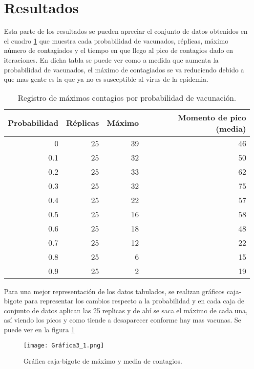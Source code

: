 \documentclass[a4paper, 11pt]{article}
\begin{document}
\section{Resultados}
Esta parte de los resultados se pueden apreciar el conjunto de datos obtenidos en el cuadro \ref{tab1} que muestra cada probabilidad de vacunados, réplicas, máximo número de contagiados y el tiempo en que llego al pico de contagios dado en iteraciones. En dicha tabla se puede ver como a medida que aumenta la probabilidad de vacunados, el máximo de contagiados se va reduciendo debido a que mas gente es la que ya no es susceptible al virus de la epidemia.
    \begin{table}[H]
        \caption{Registro de máximos contagios por probabilidad de vacunación.}
        \bigskip
        \label{tab1}
        \centering
        \begin{tabular}{|r|r|r|r|}
        \hline
         Probabilidad&Réplicas&Máximo&Momento de pico (media)  \\
        \hline
        0 & 25 & 39 & 46 \\
        \hline
        0.1 & 25 & 32 & 50  \\
        \hline
        0.2 & 25 & 33 & 62 \\
        \hline
        0.3 & 25 & 32 & 75 \\
        \hline
        0.4 & 25  & 22 & 57  \\
        \hline
        0.5 & 25 & 16 & 58 \\
        \hline
        0.6 & 25 & 18 & 48 \\
        \hline
        0.7 & 25 & 12 & 22  \\
        \hline
        0.8 & 25 & 6 & 15 \\
        \hline
        0.9 & 25 & 2 & 19 \\
        \hline
        \end{tabular}
    \end{table}
\bigskip

Para una mejor representación de los datos tabulados, se realizan gráficos caja-bigote para representar los cambios respecto a la probabilidad y en cada caja de conjunto de datos aplican las 25 replicas y de ahí se saca el máximo de cada una, así viendo los picos y como tiende a desaparecer conforme hay mas vacunas. Se puede ver en la figura \ref{f1}
\begin{figure}[H]
  \centering      
  \texttt{[image: Gráfica3\_1.png]}
  \caption{Gráfica caja-bigote de máximo y media de contagios.}
  \label{f1}
\end{figure}
\bigskip
\end{document}
